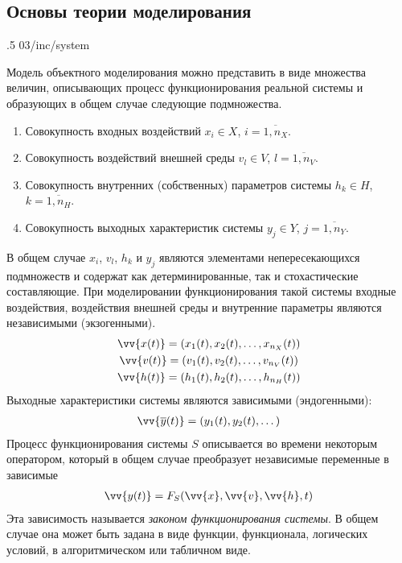 \subsection{Основы теории моделирования}

\image
{.5\textwidth}
{03/inc/system}
{}

Модель объектного моделирования можно представить в виде множества величин, описывающих процесс функционирования реальной системы и образующих в общем случае следующие подмножества.

\begin{enumerate}
    \item Совокупность входных воздействий $x_i\in X$, $i = \overline{1, n_X}$.
    \item Совокупность воздействий внешней среды $v_l\in V$, $l = \overline{1, n_V}$.
    \item Совокупность внутренних (собственных) параметров системы $h_k\in H$, $k = \overline{1, n_H}$.
    \item Совокупность выходных характеристик системы $y_j\in Y$, $j = \overline{1, n_Y}$.
\end{enumerate}

В общем случае $x_i$, $v_l$, $h_k$ и $y_j$ являются элементами непересекающихся подмножеств и содержат как детерминированные, так и стохастические составляющие. При моделировании функционирования такой системы входные воздействия, воздействия внешней среды и внутренние параметры являются независимыми (экзогенными).
%
\begin{gather*}
    \vv{x(t)} = (x_1(t), x_2(t), \dots, x_{n_X}(t))\\
    \vv{v(t)} = (v_1(t), v_2(t), \dots, v_{n_V}(t))\\
    \vv{h(t)} = (h_1(t), h_2(t), \dots, h_{n_H}(t))
\end{gather*}
%
Выходные характеристики системы являются зависимыми (эндогенными):
%
\begin{gather*}
    \vv{\overline{y}(t)} = (y_1(t), y_2(t), \dots)
\end{gather*}
%
Процесс функционирования системы $S$ описывается во времени некоторым оператором, который в общем случае преобразует независимые переменные в зависимые
%
\begin{gather*}
    \vv{y(t)} = F_S(\vv{x}, \vv{v}, \vv{h}, t)
\end{gather*}
%
Эта зависимость называется \textit{законом функционирования системы}. В общем случае она может быть задана в виде функции, функционала, логических условий, в алгоритмическом или табличном виде.

